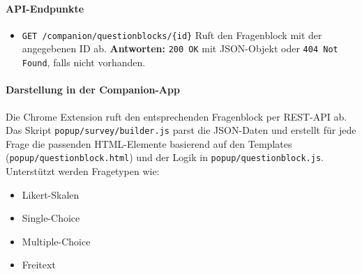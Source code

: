 \documentclass[12pt,a4paper]{report}
\begin{document}
\paragraph{API-Endpunkte}
    \begin{itemize}
        \item \texttt{GET /companion/questionblocks/\{id\}}
            Ruft den Fragenblock mit der angegebenen ID ab.
            \textbf{Antworten:} \texttt{200 OK} mit JSON-Objekt oder \texttt{404 Not Found}, falls nicht vorhanden.
    \end{itemize}

\paragraph{Darstellung in der Companion-App}
    Die Chrome Extension ruft den entsprechenden Fragenblock per REST-API ab.
    Das Skript \texttt{popup/survey/builder.js} parst die JSON-Daten und erstellt für jede Frage die passenden HTML-Elemente
    basierend auf den Templates (\texttt{popup/questionblock.html}) und der Logik in \texttt{popup/questionblock.js}.
    Unterstützt werden Fragetypen wie:
    \begin{itemize}
        \item Likert-Skalen
        \item Single-Choice
        \item Multiple-Choice
        \item Freitext
    \end{itemize}
\end{document}
